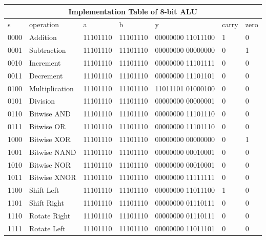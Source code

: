 \documentclass[12pt,singleside,a4paper]{article}
\begin{document}
\begin{center}
\begin{tabular}{ |p{1cm}|p{3cm}|p{2cm}|p{2cm}|p{4cm}|p{1cm}|p{1cm}| } \hline
 \multicolumn{7}{|c|}{Implementation Table of 8-bit ALU}   \\ \hline \hline
    s      &    operation        &  a           &  b           &   y             &   carry &   zero      \\ \hline
    0000   &    Addition         &   11101110   &   11101110   &   00000000 11011100      &    1      &  0          \\ \hline
    0001   &    Subtraction      &   11101110   &   11101110   &   00000000 00000000      &    0      &  1         \\\hline
    0010   &    Increment        &   11101110   &   11101110   &   00000000 11101111      &    0      &  0         \\\hline
    0011   &    Decrement        &   11101110   &   11101110   &   00000000 11101101      &    0      &  0          \\\hline
    0100   &    Multiplication   &   11101110   &   11101110   &   11011101 01000100‬     &    0      &  0          \\\hline
    0101   &    Division         &   11101110   &   11101110   &   00000000 00000001      &    0      &  0          \\\hline
     
    
    0110   &    Bitwise AND      &   11101110   &   11101110   &   00000000 11101110      &    0      &  0          \\\hline
    0111   &    Bitwise OR       &   11101110   &   11101110   &   00000000 11101110      &    0      &  0          \\\hline
    1000   &    Bitwise XOR      &   11101110   &   11101110   &   00000000 00000000      &    0      &  1         \\\hline
    1001   &   Bitwise NAND     &   11101110   &   11101110   &   00000000 00010001      &    0      &  0          \\\hline
    1010   &   Bitwise NOR       &   11101110   &   11101110   &   00000000 00010001      &    0      &  0          \\\hline
    1011   &    Bitwise XNOR     &   11101110   &   11101110   &   00000000 11111111      &    0      &  0          \\\hline
    1100   &    Shift Left       &   11101110   &   11101110   &   00000000 11011100      &    1      &  0         \\\hline
    1101   &    Shift Right      &   11101110   &   11101110   &   00000000 01110111      &    0      &  0         \\\hline
    1110   &    Rotate Right     &   11101110   &   11101110   &  00000000  01110111      &    0      &  0          \\\hline
    1111   &    Rotate Left      &   11101110   &   11101110   &   00000000 11011101      &    0      &  0          \\\hline
\end{tabular} 
\end{center}
\end{document}
